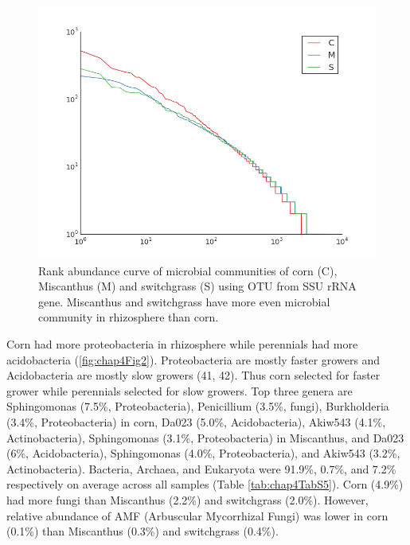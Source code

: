 \documentclass[]{msu-thesis}
\begin{document}
\begin{figure}[tbph!]
  \centering
  \includegraphics[scale=1]{figs/chap4-otu-rankabuncurve}
  \caption[Rank abundance curve of microbial communities in rhizosphere]{Rank abundance curve of microbial communities of corn (C), Miscanthus (M) and switchgrass (S) using OTU from SSU rRNA gene. Miscanthus and switchgrass have more even microbial community in rhizosphere than corn.}
  \label{fig:chap4FigS3}
\end{figure}



Corn had more proteobacteria in rhizosphere while perennials had more acidobacteria (\cref{fig:chap4Fig2}). Proteobacteria are mostly faster growers and Acidobacteria are mostly slow growers (41, 42)\cite{fierer_toward_2007,eilers_shifts_2010}. Thus corn selected for faster grower while perennials selected for slow growers. Top three genera are Sphingomonas (7.5\%, Proteobacteria), Penicillium (3.5\%, fungi), Burkholderia (3.4\%, Proteobacteria) in corn, Da023 (5.0\%, Acidobacteria), Akiw543 (4.1\%, Actinobacteria), Sphingomonas (3.1\%, Proteobacteria) in Miscanthus, and Da023 (6\%, Acidobacteria), Sphingomonas (4.0\%, Proteobacteria), and Akiw543 (3.2\%, Actinobacteria). Bacteria, Archaea, and Eukaryota were 91.9\%, 0.7\%, and 7.2\% respectively on average across all samples (Table \ref{tab:chap4TabS5}). Corn (4.9\%) had more fungi than Miscanthus (2.2\%) and switchgrass (2.0\%). However, relative abundance of AMF (Arbuscular Mycorrhizal Fungi) was lower in corn (0.1\%) than Miscanthus (0.3\%) and switchgrass (0.4\%).
\end{document}
